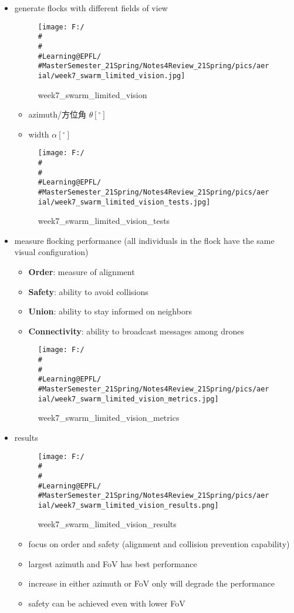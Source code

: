 \documentclass[]{article}
\begin{document}
\begin{itemize}
\item
  generate flocks with different fields of view

  \begin{figure}
  \centering
  \texttt{[image: F:/\\\#\\\#\\\#Learning@EPFL/\\\#MasterSemester\_21Spring/Notes4Review\_21Spring/pics/aerial/week7\_swarm\_limited\_vision.jpg]}
  \caption{week7\_swarm\_limited\_vision}
  \end{figure}

  \begin{itemize}
  \item
    azimuth/方位角 \(\theta [^{\circ}]\)
  \item
    width \(\alpha [^{\circ}]\)
  \end{itemize}

  \begin{figure}
  \centering
  \texttt{[image: F:/\\\#\\\#\\\#Learning@EPFL/\\\#MasterSemester\_21Spring/Notes4Review\_21Spring/pics/aerial/week7\_swarm\_limited\_vision\_tests.jpg]}
  \caption{week7\_swarm\_limited\_vision\_tests}
  \end{figure}
\item
  measure flocking performance (all individuals in the flock have the
  same visual configuration)

  \begin{itemize}
  \item
    \textbf{Order}: measure of alignment
  \item
    \textbf{Safety}: ability to avoid collisions
  \item
    \textbf{Union}: ability to stay informed on neighbors
  \item
    \textbf{Connectivity}: ability to broadcast messages among drones
  \end{itemize}

  \begin{figure}
  \centering
  \texttt{[image: F:/\\\#\\\#\\\#Learning@EPFL/\\\#MasterSemester\_21Spring/Notes4Review\_21Spring/pics/aerial/week7\_swarm\_limited\_vision\_metrics.jpg]}
  \caption{week7\_swarm\_limited\_vision\_metrics}
  \end{figure}
\item
  results

  \begin{figure}
  \centering
  \texttt{[image: F:/\\\#\\\#\\\#Learning@EPFL/\\\#MasterSemester\_21Spring/Notes4Review\_21Spring/pics/aerial/week7\_swarm\_limited\_vision\_results.png]}
  \caption{week7\_swarm\_limited\_vision\_results}
  \end{figure}

  \begin{itemize}
  \item
    focus on order and safety (alignment and collision prevention
    capability)
  \item
    largest azimuth and FoV has best performance
  \item
    increase in either azimuth or FoV only will degrade the performance
  \item
    safety can be achieved even with lower FoV
  \end{itemize}
\end{itemize}
\end{document}
